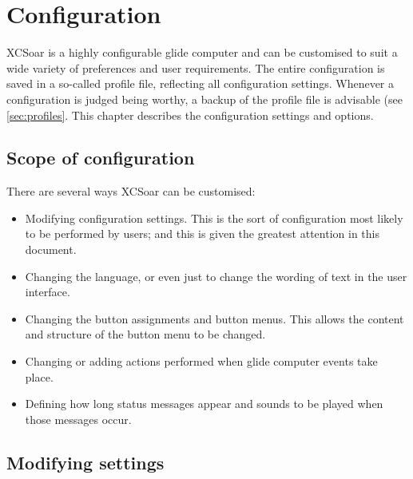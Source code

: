 \chapter{Configuration}\label{cha:configuration}\label{conf:configuration}
XCSoar is a highly configurable glide computer and can be customised
to suit a wide variety of preferences and user requirements. The entire 
configuration is saved in a so-called profile file, reflecting all 
configuration settings. Whenever a configuration is judged being worthy, a 
backup of the profile file is advisable (see \ref{sec:profiles}. This
chapter describes the configuration settings and options.

\section{Scope of configuration}

There are several ways XCSoar can be customised:
\begin{itemize}

\item Modifying configuration settings.  This is the sort of configuration
  most likely to be performed by users; and this is given the greatest attention 
  in this document.
\item Changing the language, or even just to change the wording
  of text in the user interface.
\item Changing the button assignments and button menus.  This allows 
  the content and structure of the button menu to be changed. 
\item Changing or adding actions performed when glide computer events
  take place.
\item Defining how long status messages appear and sounds to be played
  when those messages occur.
\end{itemize}

\section{Modifying settings}

